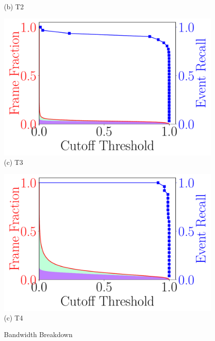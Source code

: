 \begin{figure}
\begin{minipage}[]{0.45\linewidth}
{(b) T2}
\end{minipage}

\vspace{.5in}

\begin{minipage}[]{0.45\linewidth}
\centering
    \includegraphics[width=\linewidth]{FIGS/fig-event-recall-frame-percentage-vs-threshold-raft.pdf}\\
{(c) T3}
\end{minipage}
\begin{minipage}[]{0.45\linewidth}
\centering
    \includegraphics[width=\linewidth]{FIGS/fig-event-recall-frame-percentage-vs-threshold-elephant.pdf}\\
{(c) T4}
\end{minipage}

\vspace{.5in}
\caption{Bandwidth Breakdown}
\label{fig:earlydiscard-frame-percent-breakdown}
\end{figure}

